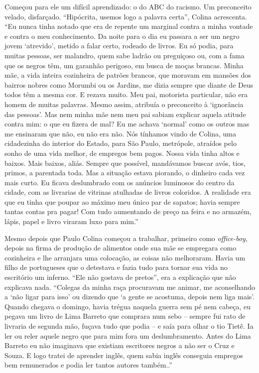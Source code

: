 \documentclass[
  letterpaper,
  DIV=11,
  numbers=noendperiod]{scrreprt}
\begin{document}
Começou para ele um difícil aprendizado: o do ABC do racismo. Um
preconceito velado, disfarçado. ``Hipócrita, usemos logo a palavra
certa'', Colina acrescenta. ``Eu nunca tinha notado que era de repente
um marginal contra a minha vontade e contra o meu conhecimento. Da noite
para o dia eu passara a ser um negro jovem `atrevido', metido a falar
certo, rodeado de livros. Eu só podia, para muitas pessoas, ser
malandro, quem sabe ladrão ou preguiçoso ou, com a fama que os negros
têm, um garanhão perigoso, em busca de moças brancas. Minha mãe, a vida
inteira cozinheira de patrões brancos, que moravam em mansões dos
bairros nobres como Morumbi ou os Jardins, me dizia sempre que diante de
Deus todos têm a mesma cor. E rezava muito. Meu pai, motorista
particular, não era homem de muitas palavras. Mesmo assim, atribuía o
preconceito à `ignorância das pessoas'. Mas nem minha mãe nem meu pai
sabiam explicar aquela atitude contra mim: o que eu fizera de mal? Eu me
achava `normal' como os outros mas me ensinaram que não, eu não era não.
Nós tínhamos vindo de Colina, uma cidadezinha do interior do Estado,
para São Paulo, metrópole, atraídos pelo sonho de uma vida melhor, de
empregos bem pagos. Nossa vida tinha altos e baixos. Mais baixos, aliás.
Sempre que possível, mandávamos buscar avós, tios, primos, a parentada
toda. Mas a situação estava piorando, o dinheiro cada vez mais curto. Eu
ficava deslumbrado com os anúncios luminosos do centro da cidade, com as
livrarias de vitrinas atulhadas de livros coloridos. A realidade era que
eu tinha que poupar ao máximo meu único par de sapatos; havia sempre
tantas contas pra pagar! Com tudo aumentando de preço na feira e no
armazém, lápis, papel e livro viraram luxo para mim.''

Mesmo depois que Paulo Colina começou a trabalhar, primeiro como
\emph{office-boy}, depois na firma de produção de alimentos onde sua mãe
se empregara como cozinheira e lhe arranjara uma colocação, as coisas
não melhoraram. Havia um filho de portugueses que o detestava e fazia
tudo para tornar sua vida no escritório um inferno. ``Ele não gostava de
pretos'', era a explicação que não explicava nada. ``Colegas da minha
raça procuravam me animar, me aconselhando a `não ligar para isso' ou
dizendo que `a gente se acostuma, depois nem liga mais'. Quando chegava
o domingo, havia trégua naquela guerra sem pé nem cabeça, eu pegava um
livro de Lima Barreto que comprara num sebo -- sempre fui rato de
livraria de segunda mão, fuçava tudo que podia -- e saía para olhar o
tio Tietê. Ia ler ou reler aquele negro que para mim fora um
deslumbramento. Antes do Lima Barreto eu não imaginava que existiam
escritores negros a não ser o Cruz e Souza. E logo tratei de aprender
inglês, quem sabia inglês conseguia empregos bem remunerados e podia ler
tantos autores também..''
\end{document}
